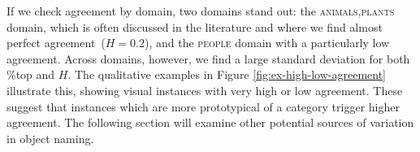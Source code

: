 If we check agreement by domain, two domains stand out: the \textsc{animals,plants} domain, which is often discussed in the literature and where we find almost perfect agreement\ (\mbox{$H=0.2$}), and the \textsc{people} domain with a particularly low agreement.
Across domains, however, we find a large standard deviation for both \%top and $H$.
The qualitative examples in Figure \ref{fig:ex-high-low-agreement} %
illustrate this, showing visual instances with very high or low agreement. 
These suggest that instances which are more prototypical of a category trigger higher agreement.
The following section will examine other potential sources of variation in object naming.


